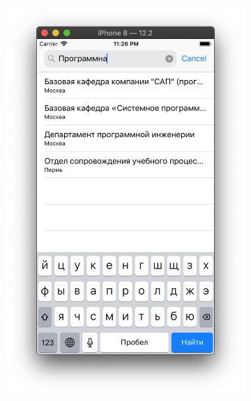 \documentclass[a4paper,12pt]{article}
\begin{document}
\begin{figure}[h!]
\begin{subfigure}[b]{0.3\linewidth}
			\includegraphics[width=\linewidth]{../includes/pmi/r3.png}
		\end{subfigure}
		\begin{subfigure}[b]{0.3\linewidth}

\end{subfigure}
\end{figure}
\end{document}
